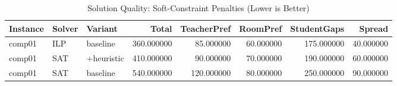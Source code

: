\begin{table}[ht]
\centering
\caption{Solution Quality: Soft-Constraint Penalties (Lower is Better)}
\label{tab:quality}
\begin{tabular}{lllrrrrr}
\toprule
Instance & Solver & Variant & Total & TeacherPref & RoomPref & StudentGaps & Spread \\
\midrule
comp01 & ILP & baseline & 360.000000 & 85.000000 & 60.000000 & 175.000000 & 40.000000 \\
comp01 & SAT & +heuristic & 410.000000 & 90.000000 & 70.000000 & 190.000000 & 60.000000 \\
comp01 & SAT & baseline & 540.000000 & 120.000000 & 80.000000 & 250.000000 & 90.000000 \\
\bottomrule
\end{tabular}
\end{table}
